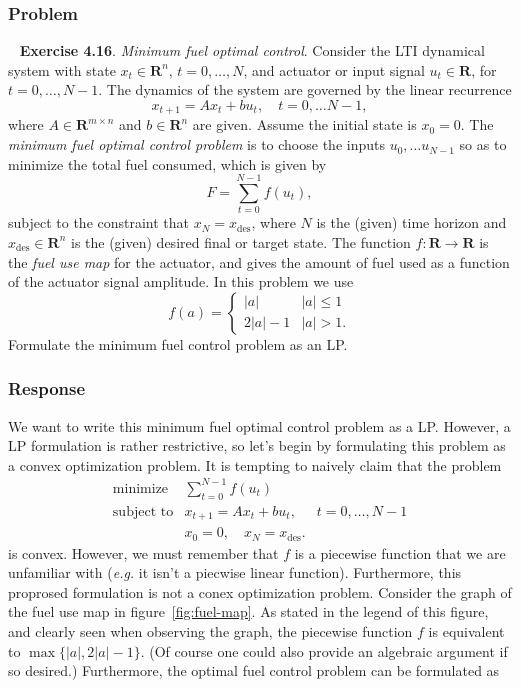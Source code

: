 \documentclass[12pt,reqno]{article}
\theoremstyle{definition}
\numberwithin{equation}{section}
\begin{document}
\subsubsection*{Problem}

\noindent~\cite{boyd_convex_optimization} \textbf{Exercise 4.16}. \textit{Minimum fuel optimal control}.
    Consider the LTI dynamical system with state $x_t \in \mathbf{R}^n$, $t = 0, \ldots, N$, and actuator
    or input signal $u_t \in \mathbf{R}$, for $t = 0, \ldots, N-1$. The dynamics of the system are governed by the
    linear recurrence
    \[x_{t+1} = Ax_t + bu_t, \quad t=0, \ldots N-1,\]
    where $A \in \mathbf{R}^{m \times n}$ and $b \in \mathbf{R}^n$ are given. Assume the initial state is $x_0 = 0$.
    The \textit{minimum fuel optimal control problem} is to choose the inputs $u_0, \ldots u_{N-1}$ so as to
    minimize the total fuel consumed, which is given by
    \[F = \sum_{t=0}^{N-1}f(u_t),\]
    subject to the constraint that $x_N = x_{\text{des}}$, where $N$ is the (given) time horizon and
    $x_{\text{des}} \in \mathbf{R}^n$ is the (given) desired final or target state. The function $f: \mathbf{R} \to \mathbf{R}$
    is the \textit{fuel use map} for the actuator, and gives the amount of fuel used as a function of the actuator signal amplitude.
    In this problem we use
    \[f(a) = \begin{cases}
        \left| a \right| & \left| a \right| \le 1 \\
        2 \left| a \right| - 1 & \left| a \right| > 1.
        \end{cases}\]
    Formulate the minimum fuel control problem as an LP. 

\subsubsection*{Response}
    We want to write this minimum
    fuel optimal control problem as a LP. However, a LP formulation is rather restrictive,
    so let's begin by formulating this problem as a convex optimization problem. It is tempting
    to naively claim that the problem
   \[\begin{array}{lll}
   \text{minimize} \; & \sum_{t=0}^{N-1} f(u_t) & \\
   \text{subject to} & x_{t+1} = Ax_t + bu_t, \; & t=0, \ldots, N-1 \\
   & x_0 = 0, \quad x_{N} = x_{\text{des}}.
   \end{array}\]
   is convex. However, we must remember that $f$ is a piecewise function that we are unfamiliar with (\textit{e.g.}
   it isn't a piecwise linear function). Furthermore, this proprosed formulation is not a conex optimization
   problem. Consider the graph of the fuel use map in figure~\ref{fig:fuel-map}. As stated in the legend of this figure,
   and clearly seen when observing the graph,
   the piecewise function $f$ is equivalent to $\max\{\left| a \right|, 2 \left| a \right| - 1\}$.
   (Of course one could also provide an algebraic argument if so desired.) Furthermore, 
   the optimal fuel control problem can be formulated as
\end{document}
